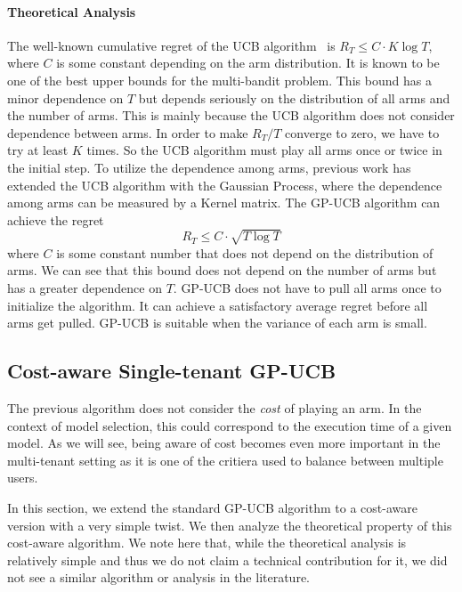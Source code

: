 \documentclass[letterpaper]{vldb}
\begin{document}
\vspace{-0.75em}
\paragraph*{Theoretical Analysis}

The well-known cumulative regret of the UCB algorithm~\cite{XXX} is $R_T \leq C\cdot K\log T$,
where $C$ is some constant depending on the arm distribution. It is known to be one of the best upper bounds for the multi-bandit problem. This bound has a minor dependence on $T$ but depends seriously on the distribution of all arms and the number of arms. This is mainly because the UCB algorithm does not consider dependence between arms. In order to make $R_T/T$ converge to zero, we have to try at least $K$ times. So the UCB algorithm must play all arms once or twice in the initial step. To utilize the dependence among arms, previous work has extended the UCB algorithm with the Gaussian Process, where the dependence among arms can be measured by a Kernel matrix. The GP-UCB algorithm can achieve the regret
\[
R_T \leq C\cdot \sqrt{T\log T}
\]
where $C$ is some constant number that does not depend on the distribution of arms. We can see that this bound does not depend on the number of arms but has a greater dependence on $T$. GP-UCB does not have to pull all arms once to initialize the algorithm. It can achieve a satisfactory average regret before all arms get pulled. GP-UCB is suitable when the variance of each arm is small.




\subsection{Cost-aware Single-tenant GP-UCB}

The previous algorithm does not consider the {\em cost} of playing an arm.
In the context of model selection, this could correspond to the execution
time of a given model. 
As we will see, being aware of cost becomes even more important in the
multi-tenant setting as it is one of the critiera used to balance between
multiple users.

In this section, we extend the standard GP-UCB algorithm to a cost-aware version
with a very simple twist. We then analyze the theoretical property of
this cost-aware algorithm. We note here that, while the theoretical
analysis is relatively simple and thus we do not claim a technical contribution for
it, we did not see a similar algorithm or analysis in the literature.
\end{document}

